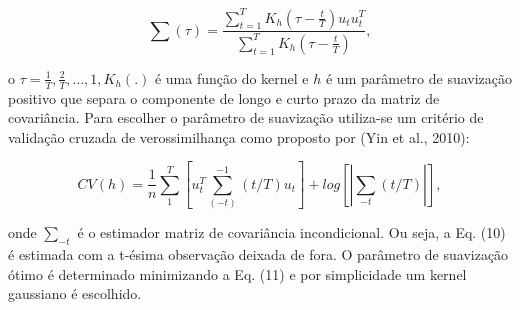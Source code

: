  	 	\begin{equation}
 	 	\hat{\sum}(\tau)=\frac{\sum_{t=1}^{T} K_h (\tau-\frac{t}{T})u_t u_t^T}{\sum_{t=1}^{T}K_h(\tau-\frac{t}{T})},
 	 	\end{equation}
 	 	
 	 	
 	 	o $ \tau = \frac{1}{T}, \frac{2}{T}, \dots, 1, K_h (.)$ é uma função do kernel e $h$ é um parâmetro de suavização positivo que separa o componente de longo e curto prazo da matriz de covariância. Para escolher  o parâmetro de suavização utiliza-se um critério de validação cruzada de verossimilhança  
 	 	como proposto por (Yin et al., 2010):
 	 	
 	 	\begin{equation}
 	 	CV(h)= \frac{1}{n} \sum_{1}^{T}    [u_t^T \sum_{(-t)}^{-1} (t/T)u_t] + log[|\sum_{-t} (t/T)|],
 	 	\end{equation}
 	 	
 	 	onde $\sum_{-t}$ é o estimador  matriz de covariância incondicional. Ou seja, a Eq. (10) é estimada com a t-ésima observação deixada de fora. O parâmetro de suavização ótimo é determinado minimizando a Eq. (11) e por simplicidade um kernel gaussiano é escolhido. 
